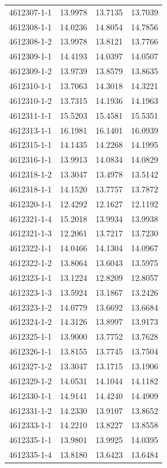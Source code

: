 \begin{longtable}{lrrr}
4612307-1-1 & 13.9978 & 13.7135 & 13.7039 \\
4612308-1-1 & 14.0236 & 14.8054 & 14.7856 \\
4612308-1-2 & 13.9978 & 13.8121 & 13.7766 \\
4612309-1-1 & 14.4193 & 14.0397 & 14.0507 \\
4612309-1-2 & 13.9739 & 13.8579 & 13.8635 \\
4612310-1-1 & 13.7063 & 14.3018 & 14.3221 \\
4612310-1-2 & 13.7315 & 14.1936 & 14.1963 \\
4612311-1-1 & 15.5203 & 15.4581 & 15.5351 \\
4612313-1-1 & 16.1981 & 16.1401 & 16.0939 \\
4612315-1-1 & 14.1435 & 14.2268 & 14.1995 \\
4612316-1-1 & 13.9913 & 14.0834 & 14.0829 \\
4612318-1-2 & 13.3047 & 13.4978 & 13.5142 \\
4612318-1-1 & 14.1520 & 13.7757 & 13.7872 \\
4612320-1-1 & 12.4292 & 12.1627 & 12.1192 \\
4612321-1-4 & 15.2018 & 13.9934 & 13.9938 \\
4612321-1-3 & 12.2061 & 13.7217 & 13.7230 \\
4612322-1-1 & 14.0466 & 14.1304 & 14.0967 \\
4612322-1-2 & 13.8064 & 13.6043 & 13.5975 \\
4612323-1-1 & 13.1224 & 12.8209 & 12.8057 \\
4612323-1-3 & 13.5924 & 13.1867 & 13.2426 \\
4612323-1-2 & 14.0779 & 13.6692 & 13.6684 \\
4612324-1-2 & 14.3126 & 13.8997 & 13.9173 \\
4612325-1-1 & 13.9000 & 13.7752 & 13.7628 \\
4612326-1-1 & 13.8155 & 13.7745 & 13.7504 \\
4612327-1-2 & 13.3047 & 13.1715 & 13.1906 \\
4612329-1-2 & 14.0531 & 14.1044 & 14.1182 \\
4612330-1-1 & 14.9141 & 14.4240 & 14.4909 \\
4612331-1-2 & 14.2330 & 13.9107 & 13.8652 \\
4612333-1-1 & 14.2210 & 13.8227 & 13.8558 \\
4612335-1-1 & 13.9801 & 13.9925 & 14.0395 \\
4612335-1-4 & 13.8180 & 13.6423 & 13.6484 \\

\end{longtable}
